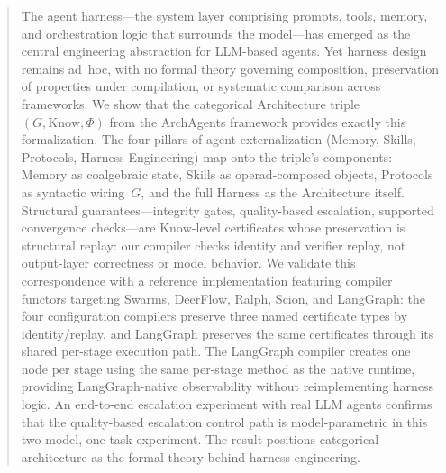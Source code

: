 \begin{abstract}
The agent harness---the system layer comprising prompts, tools, memory, and orchestration logic that surrounds the model---has emerged as the central engineering abstraction for LLM-based agents. Yet harness design remains ad~hoc, with no formal theory governing composition, preservation of properties under compilation, or systematic comparison across frameworks. We show that the categorical Architecture triple $(G, \mathrm{Know}, \Phi)$ from the ArchAgents framework provides exactly this formalization. The four pillars of agent externalization (Memory, Skills, Protocols, Harness Engineering) map onto the triple's components: Memory as coalgebraic state, Skills as operad-composed objects, Protocols as syntactic wiring~$G$, and the full Harness as the Architecture itself. Structural guarantees---integrity gates, quality-based escalation, supported convergence checks---are $\mathrm{Know}$-level certificates whose preservation is structural replay: our compiler checks identity and verifier replay, not output-layer correctness or model behavior. We validate this correspondence with a reference implementation featuring compiler functors targeting Swarms, DeerFlow, Ralph, Scion, and LangGraph: the four configuration compilers preserve three named certificate types by identity/replay, and LangGraph preserves the same certificates through its shared per-stage execution path. The LangGraph compiler creates one node per stage using the same per-stage method as the native runtime, providing LangGraph-native observability without reimplementing harness logic. An end-to-end escalation experiment with real LLM agents confirms that the quality-based escalation control path is model-parametric in this two-model, one-task experiment. The result positions categorical architecture as the formal theory behind harness engineering.
\end{abstract}
